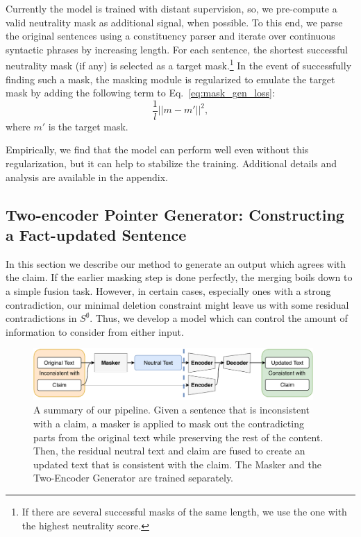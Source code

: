 \documentclass[letterpaper]{article} %
\renewcommand{\eqref}[1]{Eq.~\ref{#1}}
\begin{document}
Currently the model is trained with distant supervision, so, we pre-compute a valid neutrality mask as additional signal, when possible. To this end, we parse the original sentences using a constituency parser and iterate over continuous syntactic phrases by increasing length. For each sentence, the shortest successful neutrality mask (if any) is selected as a target mask.\footnote{If there are several successful masks of the same length, we use the one with the highest neutrality score.} In the event of successfully finding such a mask, the masking module is regularized to emulate the target mask by adding the following term to \eqref{eq:mask_gen_loss}:
\begin{equation}
    \frac{1}{l} || m - m' ||^2,
    \label{eq:boots}
\end{equation}
where $m'$ is the target mask.

Empirically, we find that the model can perform well even without this regularization, but it can help to stabilize the training. Additional details and analysis are available in the appendix.

\subsection{Two-encoder Pointer Generator: Constructing a Fact-updated Sentence} \label{sec:pointer_gen}
In this section we describe our method to generate an output which agrees with the claim. If the earlier masking step is done perfectly, the merging boils down to a simple fusion task. However, in certain cases, especially ones with a strong contradiction, our minimal deletion constraint might leave us with some residual contradictions in $S^{\emptyset}$. Thus, we develop a model which can control the amount of information to consider from either input.

\begin{figure}[!t]
\centering
\includegraphics[width=0.95\textwidth]{inference_pipeline_wtrain.pdf}
\caption{A summary of our pipeline. Given a sentence that is inconsistent with a claim, a masker is applied to mask out the contradicting parts from the original text while preserving the rest of the content. Then, the residual neutral text and claim are fused to create an updated text that is consistent with the claim. The Masker and the Two-Encoder Generator are trained separately.
 \label{fig:pipeline}}
\end{figure}
\end{document}
